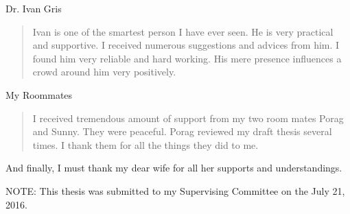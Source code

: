 \noindent
Dr. Ivan Gris
\begin{quote}
  Ivan is one of the smartest person I have ever seen. He is very practical and supportive. I received numerous suggestions and advices from him. I found him very reliable and hard working. His mere presence influences a crowd around him very positively. 
\end{quote}

\noindent
My Roommates
\begin{quote}
  I received tremendous amount of support from my two room mates Porag and Sunny. They were peaceful. Porag reviewed my draft thesis several times. I thank them for all the things they did to me.
\end{quote}



And finally, I must thank my dear wife for all her supports and understandings. 

\vfill
\noindent
NOTE: This thesis was submitted to my Supervising Committee on the July 21, 2016.
